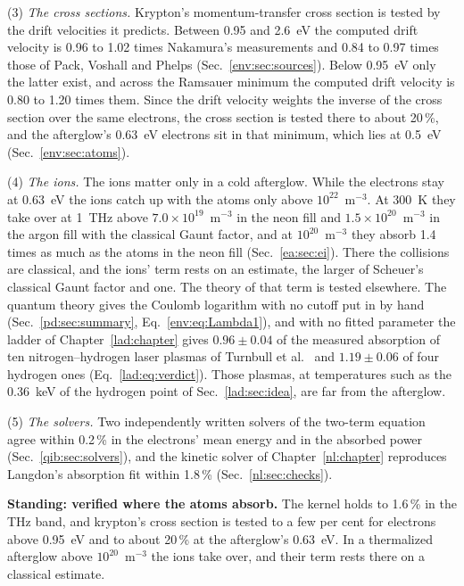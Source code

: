 {\noindent}(3) \emph{The cross sections.} Krypton's momentum-transfer cross section is
tested by the drift velocities it predicts. Between 0.95 and 2.6~eV the computed drift
velocity is 0.96 to 1.02 times Nakamura's measurements \cite{p1:Nakamura1991} and 0.84
to 0.97 times those of Pack, Voshall and Phelps \cite{p1:Pack1962}
(Sec.~\ref{env:sec:sources}). Below 0.95~eV only the latter exist, and across the
Ramsauer minimum the computed drift velocity is 0.80 to 1.20 times them. Since the
drift velocity weights the inverse of the cross section over the same electrons, the
cross section is tested there to about 20\,\%, and the afterglow's 0.63~eV electrons
sit in that minimum, which lies at 0.5~eV (Sec.~\ref{env:sec:atoms}).

{\noindent}(4) \emph{The ions.} The ions matter only in a cold afterglow. While the
electrons stay at 0.63~eV the ions catch up with the atoms only above
$10^{22}$~m$^{-3}$. At 300~K they take over at 1~THz above $7.0\times10^{19}$~m$^{-3}$
in the neon fill and $1.5\times10^{20}$~m$^{-3}$ in the argon fill with the classical
Gaunt factor, and at $10^{20}$~m$^{-3}$ they absorb 1.4 times as much as the atoms in
the neon fill (Sec.~\ref{ea:sec:ei}). There the collisions are classical, and the ions'
term rests on an estimate, the larger of Scheuer's classical Gaunt factor and one. The
theory of that term is tested elsewhere. The quantum theory gives the Coulomb logarithm
with no cutoff put in by hand (Sec.~\ref{pd:sec:summary}, Eq.~\eqref{env:eq:Lambda1}),
and with no fitted parameter the ladder of Chapter~\ref{lad:chapter} gives
$0.96\pm0.04$ of the measured absorption of ten nitrogen--hydrogen laser plasmas of
Turnbull et al.\ \cite{p1:Turnbull2023,p1:Turnbull2024} and $1.19\pm0.06$ of four
hydrogen ones (Eq.~\eqref{lad:eq:verdict}). Those plasmas, at temperatures such as the
0.36~keV of the hydrogen point of Sec.~\ref{lad:sec:idea}, are far from the afterglow.

{\noindent}(5) \emph{The solvers.} Two independently written solvers of the two-term
equation agree within 0.2\,\% in the electrons' mean energy and in the absorbed power
(Sec.~\ref{qib:sec:solvers}), and the kinetic solver of Chapter~\ref{nl:chapter}
reproduces Langdon's absorption fit within 1.8\,\% (Sec.~\ref{nl:sec:checks}).

\medskip
\noindent\textbf{Standing: verified where the atoms absorb.} The kernel holds to 1.6\,\%
in the THz band, and krypton's cross section is tested to a few per cent for electrons
above 0.95~eV and to about 20\,\% at the afterglow's 0.63~eV. In a thermalized
afterglow above $10^{20}$~m$^{-3}$ the ions take over, and their term rests there on a
classical estimate.


